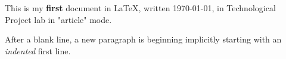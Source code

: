\documentclass[a4paper]{article}
\begin{document}
This is my \textbf{first} document in \LaTeX, written \today,
in Technological Project lab in "article" mode.

After a blank line, a new paragraph is beginning implicitly starting with an \emph{indented} first line.
\end{document}
